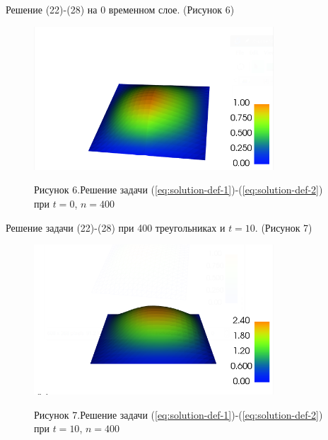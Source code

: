 Решение (22)-(28) на 0 временном слое. (Рисунок 6)
\begin{figure}[H]
      \centering
      \includegraphics[width=0.8\textwidth]{plots/n20t0.png}\\
      \centering\caption*{Рисунок 6.Решение задачи (\ref{eq:solution-def-1})-(\ref{eq:solution-def-2}) при $t=0$, $n=400$}
\end{figure}

Решение задачи (22)-(28) при 400 треугольниках и $t=10$. (Рисунок 7)
\begin{figure}[H]
      \centering
      \includegraphics[width=0.8\textwidth]{plots/n20t10.png}\\
      \centering\caption*{Рисунок 7.Решение задачи (\ref{eq:solution-def-1})-(\ref{eq:solution-def-2}) при $t=10$, $n=400$}
\end{figure}

